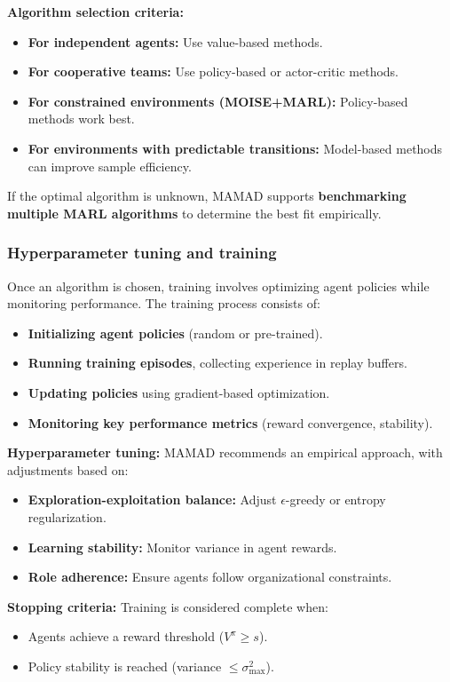 \documentclass[pdflatex,sn-mathphys-num]{sn-jnl}%
\theoremstyle{thmstyleone}%
\theoremstyle{thmstyletwo}%
\theoremstyle{thmstylethree}%
\begin{document}
\noindent \textbf{Algorithm selection criteria:}
\begin{itemize}
    \item \textbf{For independent agents:} Use value-based methods.
    \item \textbf{For cooperative teams:} Use policy-based or actor-critic methods.
    \item \textbf{For constrained environments (MOISE+MARL):} Policy-based methods work best.
    \item \textbf{For environments with predictable transitions:} Model-based methods can improve sample efficiency.
\end{itemize}

\noindent If the optimal algorithm is unknown, MAMAD supports \textbf{benchmarking multiple MARL algorithms} to determine the best fit empirically.

\subsubsection{Hyperparameter tuning and training}
Once an algorithm is chosen, training involves optimizing agent policies while monitoring performance. The training process consists of:
\begin{itemize}
    \item \textbf{Initializing agent policies} (random or pre-trained).
    \item \textbf{Running training episodes}, collecting experience in replay buffers.
    \item \textbf{Updating policies} using gradient-based optimization.
    \item \textbf{Monitoring key performance metrics} (reward convergence, stability).
\end{itemize}

\noindent \textbf{Hyperparameter tuning:}
MAMAD recommends an empirical approach, with adjustments based on:
\begin{itemize}
    \item \textbf{Exploration-exploitation balance:} Adjust $\epsilon$-greedy or entropy regularization.
    \item \textbf{Learning stability:} Monitor variance in agent rewards.
    \item \textbf{Role adherence:} Ensure agents follow organizational constraints.
\end{itemize}

\noindent \textbf{Stopping criteria:}
Training is considered complete when:
\begin{itemize}
    \item Agents achieve a reward threshold ($V^{\pi} \geq s$).
    \item Policy stability is reached (variance $\leq \sigma_{\max}^2$).
\end{itemize}
\end{document}
